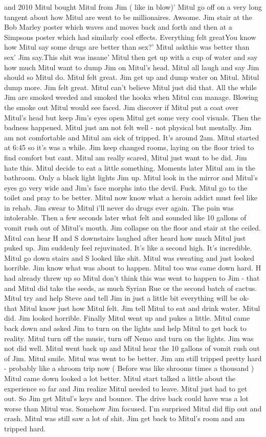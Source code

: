 \documentclass[12pt]{book}
\begin{document}
and 2010 Mitul bought Mitul from Jim ( like in blow)' Mitul go off on a very long tangent about how Mitul are went to be millionaires. Awsome. Jim stair at the Bob Marley poster which waves and moves back and forth and then at a Simpsons poster which had similarly cool effects. Everything felt greatYou know how Mitul say some drugs are better than sex?' Mitul askthis was better than sex' Jim say.This shit was insane' Mitul then get up with a cup of water and say how much Mitul want to dump Jim on Mitul's head. Mitul all laugh and say Jim should so Mitul do. Mitul felt great. Jim get up and dump water on Mitul. Mitul dump more. Jim felt great. Mitul can't believe Mitul just did that. All the while Jim are smoked weeded and smoked the hooka when Mitul can manage. Blowing the smoke out Mitul would see faced. Jim discover if Mitul put a coat over Mitul's head but keep Jim's eyes open Mitul get some very cool visuals. Then the badness happened. Mitul just am not felt well - not physical but mentally. Jim am not comfortable and Mitul am sick of tripped. It's around 2am. Mitul started at 6:45 so it's was a while. Jim keep changed rooms, laying on the floor tried to find comfort but cant. Mitul am really scared, Mitul just want to be did. Jim hate this. Mitul decide to eat a little something. Moments later Mitul am in the bathroom. Only a black light lights Jim up. Mitul look in the mirror and Mitul's eyes go very wide and Jim's face morphs into the devil. Fuck. Mitul go to the toilet and pray to be better. Mitul now know what a heroin addict must feel like in rehab. Jim swear to Mitul i'll never do drugs ever again. The pain was intolerable. Then a few seconds later what felt and sounded like 10 gallons of vomit rush out of Mitul's mouth. Jim collapse on the floor and stair at the ceiled. Mitul can hear H and S downstairs laughed after heard how much Mitul just puked up. Jim suddenly feel rejuvinated. It's like a second high. It's incredible. Mitul go down stairs and S looked like shit. Mitul was sweating and just looked horrible. Jim know what was about to happen. Mitul too was came down hard. H had already threw up so Mitul don't think this was went to happen to Jim - that and Mitul did take the seeds, as much Syrian Rue or the second batch of cactus. Mitul try and help Steve and tell Jim in just a little bit everything will be ok- that Mitul know just how Mitul felt. Jim tell Mitul to eat and drink water. Mitul did. Jim looked horrible. Finally Mitul went up and pukes a little. Mitul came back down and asked Jim to turn on the lights and help Mitul to get back to reality. Mitul turn off the music, turn off Nemo and turn on the lights. Jim was not did well. Mitul went back up and Mitul hear the 10 gallons of vomit rush out of Jim. Mitul smile. Mitul was went to be better. Jim am still tripped pretty hard - probably like a shroom trip now ( Before was like shrooms times a thousand ) Mitul came down looked a lot better. Mitul start talked a little about the experience so far and Jim realize Mitul needed to leave. Mitul just had to get out. So Jim get Mitul's keys and bounce. The drive back could have was a lot worse than Mitul was. Somehow Jim focused. I'm surprised Mitul did flip out and crash. Mitul was still saw a lot of shit. Jim get back to Mitul's room and am tripped hard. 
\end{document}
